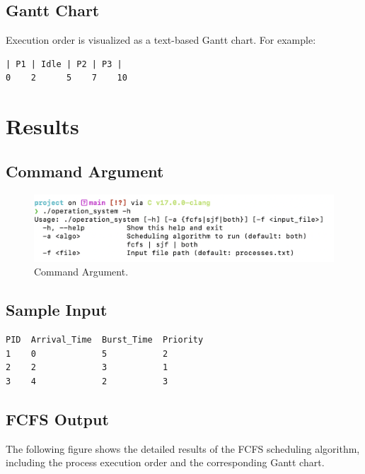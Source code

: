 \documentclass[12pt,a4paper]{article}
\begin{document}
\subsection{Gantt Chart}
Execution order is visualized as a text-based Gantt chart. For example:

\begin{verbatim}
| P1 | Idle | P2 | P3 |
0    2      5    7    10
\end{verbatim}

\section{Results}

\subsection{Command Argument}
\begin{figure}[h]
    \centering
    \includegraphics[width=0.9\linewidth]{h.png}
    \caption{Command Argument.}
\end{figure}
\subsection{Sample Input}
\begin{verbatim}
PID  Arrival_Time  Burst_Time  Priority
1    0             5           2
2    2             3           1
3    4             2           3
\end{verbatim}
\subsection{FCFS Output}
The following figure shows the detailed results of the FCFS scheduling algorithm,
including the process execution order and the corresponding Gantt chart.
\end{document}
